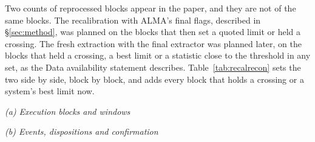 Two counts of reprocessed blocks appear in the paper, and they are not of
the same blocks. The recalibration with ALMA's final flags, described in
\S\ref{sec:method}, was planned on the blocks that then set a quoted limit or held a crossing.
The fresh extraction with the final extractor was planned later, on the
blocks that held a crossing, a best limit or a statistic close to the
threshold in any set, as the Data availability statement describes. Table~\ref{tab:recalrecon} sets
the two side by side, block by block, and adds every block that holds a
crossing or a system's best limit now.

\begin{table}
\centering
\scriptsize
\caption{\textbf{The survey ledger}: (a)~execution blocks and windows, hours
being window-hours, so the classes partition the hours as they partition the
windows; (b)~events, dispositions and confirmation. Each sub-row is a subset of the row its number extends. Note~d gives the
rule by which the counts of panel (a) sum.}
\label{tab:blockledger}
\textit{(a) Execution blocks and windows}\par\smallskip

\par\medskip
\textit{(b) Events, dispositions and confirmation}\par\smallskip

\end{table}

\begin{table}
\centering
\scriptsize
\setlength{\tabcolsep}{3pt}
\caption{\textbf{Recalibration and extractor} of the blocks counted in
\S\ref{sec:method} or the Data availability statement, or holding a
crossing or a best limit now.}
\label{tab:recalrecon}

\end{table}

\begin{table}
\centering
\scriptsize
\caption{\textbf{The \NProjCodes{} ALMA proposals the searched blocks belong
to}, as \mbox{ADS/JAO.ALMA\#\textit{code}}. Every census block belongs to
one.\ProjCodeUnresClause}
\label{tab:projcodes}

\end{table}
